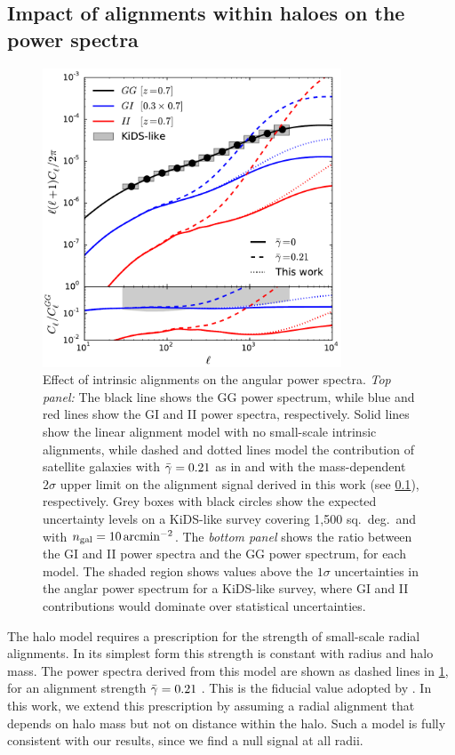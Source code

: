 \subsection{Impact of alignments within haloes on the power spectra}\label{s:1haloIA}

\begin{figure}
 \centerline{\includegraphics[width=3.5in]{chapter4/cl_cross.pdf}}
\caption{\small Effect of intrinsic alignments on the angular power spectra. \textit{Top panel:} 
The black line shows the GG power spectrum, while blue and red lines show the GI and II power 
spectra, respectively. Solid lines show the linear alignment model with no small-scale intrinsic 
alignments, while dashed and dotted lines model the contribution of satellite galaxies with 
$\bar{\gamma}=0.21$ as in \cite{schneider10} and with the mass-dependent $2\sigma$ upper limit on the 
alignment signal derived in this work (see \cref{s:1haloIA}), respectively. Grey boxes with black 
circles show the expected uncertainty levels on a KiDS-like survey covering 1,500 sq.\ deg.\ and 
with $n_{\rm gal}=10\,\mathrm{arcmin^{-2}}$. The \textit{bottom panel} shows the ratio between the 
GI and II power spectra and the GG power spectrum, for each model. The shaded region shows values 
above the $1\sigma$ uncertainties in the anglar power spectrum for a KiDS-like survey, where GI and 
II contributions would dominate over statistical uncertainties.}
\label{f:powerspectra}
\end{figure}

The halo model requires a prescription for the strength of small-scale radial alignments. In its 
simplest form this strength is constant with radius and halo mass. The power spectra derived from 
this model are shown as dashed lines in \cref{f:powerspectra}, for an alignment strength 
$\bar{\gamma}=0.21$ \citep[$\ebar$ is the 3-dimensional alignment strength derived from a projected 
measurement, $\gamma^I$; see][]{schneider10}. This is the fiducial value adopted by 
\cite{schneider10}. In this work, we extend this prescription by assuming a radial alignment that 
depends on halo mass but not on distance within the halo. Such a model is fully consistent with our 
results, since we find a null signal at all radii.

